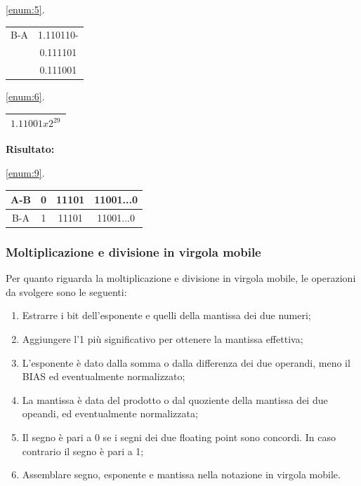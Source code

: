 \begin{example}[Sottrazione]
\begin{center}
\begin{tabular}{|c|c|}
    \end{tabular}
    \end{center}
    \begin{center}
    \ref{enum:5}.\hspace{1cm}
    \begin{tabular}{|c|c|}
        \hline B-A & 1.110110-\\
        & 0.111101\\\hline
        \hline & 0.111001\\\hline
    \end{tabular}
    \end{center}
    \begin{center}
    \ref{enum:6}.\hspace{1cm}
    \begin{tabular}{|c|}
        \hline \textbf{$1.11001x2^{29}$}\\\hline
    \end{tabular}
    \end{center}
    \textbf{Risultato:}
    \begin{center}
    \ref{enum:9}.\hspace{1cm}
    \begin{tabular}{|c||c|c|c|}
        \hline A-B & 0 & 11101 & 11001...0\\\hline
        \hline B-A & 1 & 11101 & 11001...0\\\hline
    \end{tabular}
    \end{center}
\end{example}

\subsubsection{Moltiplicazione e divisione in virgola mobile}
Per quanto riguarda la moltiplicazione e divisione in virgola mobile, le operazioni da svolgere sono le seguenti:
\begin{enumerate}
    \item\label{ennum:1} Estrarre i bit dell’esponente e quelli della mantissa dei due numeri;
    \item\label{ennum:2} Aggiungere l’1 più significativo per ottenere la mantissa effettiva;
    \item\label{ennum:3} L'esponente è dato dalla somma o dalla differenza dei due operandi, meno il BIAS ed eventualmente normalizzato;
    \item La mantissa è data del prodotto o dal quoziente della mantissa dei due opeandi, ed eventualmente normalizzata;
    \item Il segno è pari a 0 se i segni dei due floating point sono concordi. In caso contrario il segno è pari a 1;
    \item Assemblare segno, esponente e mantissa nella notazione in virgola mobile.
\end{enumerate}

